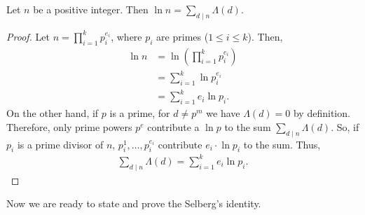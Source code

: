 \documentclass{subfile}
\begin{document}
	\begin{theorem}
		\label{thm:vonmangoldt}
		Let $n$ be a positive integer. Then $\ln n=\sum_{d\mid n}\Lambda(d)$.
	\end{theorem}

	\begin{proof}
		Let $n=\prod_{i=1}^kp_i^{e_i}$, where $p_i$ are primes ($1 \leq i \leq k$). Then,
			\begin{align*}
				\ln n  & =\ln\left(\prod_{i=1}^kp_i^{e_i}\right)\\
						&=\sum_{i=1}^k\ln{p_i^{e_i}}\\
						&=\sum_{i=1}^ke_i\ln p_i.
			\end{align*}
		On the other hand, if $p$ is a prime, for $d\neq p^m$ we have $\Lambda(d)=0$ by definition. Therefore, only prime powers $p^e$ contribute a $\ln p$ to the sum $\sum_{d\mid n}\Lambda(d)$. So, if $p_i$ is a prime divisor of $n$, $p_i^1,\ldots,p_i^{e_i}$ contribute $e_i \cdot \ln p_i$ to the sum. Thus,
			\begin{align*}
				\sum_{d\mid n}\Lambda(d) = \sum\limits_{i=1}^ke_i\ln p_i.
			\end{align*}

	\end{proof}
	Now we are ready to state and prove the Selberg's identity.
\end{document}

